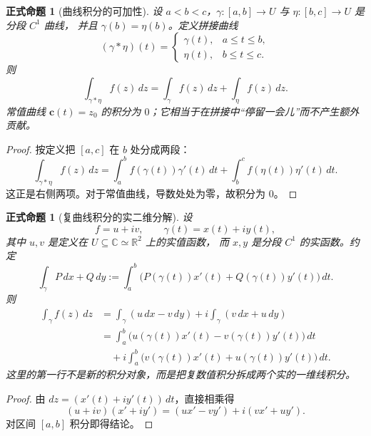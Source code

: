 \documentclass[UTF8,fontset=none,a4paper,11pt]{ctexart}
\theoremstyle{foundation-definition}
\theoremstyle{foundation-theorem}
\theoremstyle{foundation-proposition}
\newtheorem{proposition}[definition]{正式命题}
\theoremstyle{foundation-example}
\theoremstyle{foundation-remark}
\theoremstyle{foundation-theorem}
\begin{document}
\begin{proposition}[曲线积分的可加性]\label{prop:curve-integral-concatenation}
设 \(a<b<c\)，\(\gamma:[a,b]\to U\) 与 \(\eta:[b,c]\to U\) 是分段 \(C^1\) 曲线，
并且 \(\gamma(b)=\eta(b)\)。定义拼接曲线
\[
(\gamma*\eta)(t)=
\begin{cases}
\gamma(t),&a\leq t\leq b,\\
\eta(t),&b\leq t\leq c.
\end{cases}
\]
则
\[
\int_{\gamma*\eta}f(z)\,dz
=\int_\gamma f(z)\,dz+\int_\eta f(z)\,dz.
\]
常值曲线 \(\mathbf c(t)=z_0\) 的积分为 \(0\)；它相当于在拼接中“停留一会儿”而不产生额外贡献。
\end{proposition}

\begin{proof}
按定义把 \([a,c]\) 在 \(b\) 处分成两段：
\[
\int_{\gamma*\eta}f(z)\,dz
=\int_a^b f(\gamma(t))\gamma'(t)\,dt
+\int_b^c f(\eta(t))\eta'(t)\,dt.
\]
这正是右侧两项。对于常值曲线，导数处处为零，故积分为 \(0\)。
\end{proof}

\begin{proposition}[复曲线积分的实二维分解]\label{prop:complex-integral-real-form}
设
\[
f=u+iv,\qquad \gamma(t)=x(t)+iy(t),
\]
其中 \(u,v\) 是定义在 \(U\subseteq\mathbb C\simeq\mathbb R^2\) 上的实值函数，
而 \(x,y\) 是分段 \(C^1\) 的实函数。约定
\[
\int_\gamma P\,dx+Q\,dy
:=\int_a^b\bigl(P(\gamma(t))x'(t)+Q(\gamma(t))y'(t)\bigr)\,dt.
\]
则
\[
\begin{aligned}
\int_\gamma f(z)\,dz
&=\int_\gamma (u\,dx-v\,dy)
+i\int_\gamma (v\,dx+u\,dy)\\
&=\int_a^b\!\bigl(u(\gamma(t))x'(t)-v(\gamma(t))y'(t)\bigr)\,dt\\
&\quad+i\int_a^b\!\bigl(v(\gamma(t))x'(t)+u(\gamma(t))y'(t)\bigr)\,dt.
\end{aligned}
\]
这里的第一行不是新的积分对象，而是把复数值积分拆成两个实的一维线积分。
\end{proposition}

\begin{proof}
由 \(dz=(x'(t)+iy'(t))\,dt\)，直接相乘得
\[
(u+iv)(x'+iy')=(ux'-vy')+i(vx'+uy').
\]
对区间 \([a,b]\) 积分即得结论。
\end{proof}
\end{document}
